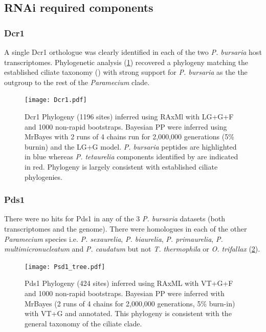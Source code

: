 \subsection{RNAi required components}

\subsubsection{Dcr1}

A single Dcr1 orthologue was clearly identified in each of
the two \textit{P. bursaria} host transcriptomes.
Phylogenetic analysis (\cref{fig:dcr1}) recovered a phylogeny
matching the established ciliate taxonomy (\citep{Aury2006,Fokin2004,Swart2013}) with strong support
for \textit{P. bursaria} as the the outgroup to the rest of 
the \textit{Paramecium} clade. 

\begin{figure}
    \texttt{[image: Dcr1.pdf]}
    \caption[Dcr1 Phylogeny]{Dcr1 Phylogeny (1196 sites) inferred using RAxMl with
        LG+G+F and 1000 non-rapid bootstraps.  Bayesian PP 
        were inferred using MrBayes with 2 runs of 4 chains run for 2,000,000
        generations (5\% burnin) and the LG+G model.  \textit{P. bursaria} peptides
        are highlighted in blue whereas \textit{P. tetaurelia} components
    identified by \citep{Marker2014} are indicated in red.  Phylogeny
is largely consistent with established ciliate phylogenies.}
    \label{fig:dcr1}
\end{figure}


\subsubsection{Pds1}

There were no hits for Pds1 in any of the 3 \textit{P. bursaria} datasets 
(both transcriptomes and the genome).  
There were homologues in each of the other \textit{Paramecium} species
i.e. \textit{P. sexaurelia}, \textit{P. biaurelia}, \textit{P. primaurelia},
\textit{P. multimicronucleatum} and \textit{P. caudatum} but not
\textit{T. thermophila} or \textit{O. trifallax} (\cref{fig:pds1}).
\begin{figure}
    \texttt{[image: Psd1\_tree.pdf]}
    \caption[Pds1 Phylogeny]{Pds1 Phylogeny (424 sites) inferred
        using RAxML with VT+G+F and 1000 non-rapid bootstraps.  Bayesian
        PP were inferred with MrBayes (2 runs of 4 chains for 2,000,000 generations, 5\% burn-in) 
        with VT+G and annotated. This phylogeny is consistent with the general
    taxonomy of the ciliate clade.}
\label{fig:pds1}
\end{figure}

